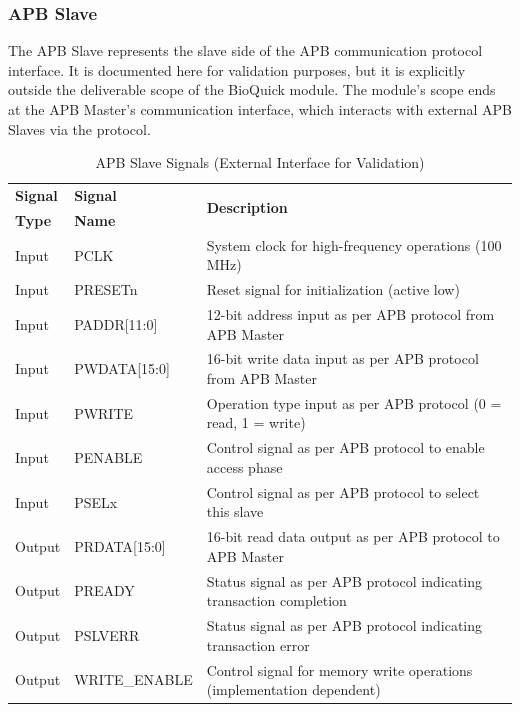\subsubsection{APB Slave}
The APB Slave represents the slave side of the APB communication protocol interface. It is documented here for validation purposes, but it is explicitly outside the deliverable scope of the BioQuick module. The module's scope ends at the APB Master's communication interface, which interacts with external APB Slaves via the protocol.

\begin{table}[!htb]
    \centering
    \caption{APB Slave Signals (External Interface for Validation)}
    \label{tab:apb-slave-signals}
    \begin{tabular}{|m{}|m{}|m{}|}
        \hline
        \textbf{Signal} & \textbf{Signal} & \multirow{2}{*}{\textbf{Description}} \\
        \textbf{Type} & \textbf{Name} & \\
        \hline
        Input & PCLK & System clock for high-frequency operations (100 MHz) \\
        Input & PRESETn & Reset signal for initialization (active low) \\
        Input & PADDR[11:0] & 12-bit address input as per APB protocol from APB Master \\
        Input & PWDATA[15:0] & 16-bit write data input as per APB protocol from APB Master \\
        Input & PWRITE & Operation type input as per APB protocol (0 = read, 1 = write) \\
        Input & PENABLE & Control signal as per APB protocol to enable access phase \\
        Input & PSELx & Control signal as per APB protocol to select this slave \\
        Output & PRDATA[15:0] & 16-bit read data output as per APB protocol to APB Master \\
        Output & PREADY & Status signal as per APB protocol indicating transaction completion \\
        Output & PSLVERR & Status signal as per APB protocol indicating transaction error \\
        Output & WRITE\_ENABLE & Control signal for memory write operations (implementation dependent) \\
        \hline
    \end{tabular}
\end{table}

